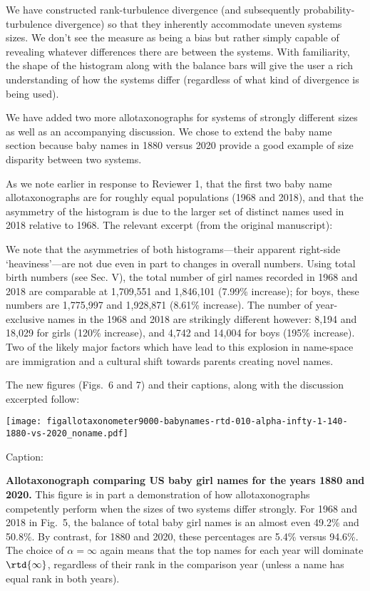 We have constructed rank-turbulence divergence
(and subsequently probability-turbulence divergence)
so that they inherently accommodate uneven systems sizes.
We don't see the measure as being a bias but rather
simply capable of revealing whatever differences there
are between the systems.
With familiarity, the shape of the histogram along with the balance bars
will give the user a rich understanding of how the systems differ
(regardless of what kind of divergence is being used).

We have added two more allotaxonographs for systems of strongly different sizes
as well as an accompanying discussion.
We chose to extend the baby name section because baby names in 1880 versus 2020
provide a good example of size disparity between two systems.

As we note earlier in response to Reviewer 1,
that the first two baby name allotaxonographs are for roughly
equal populations (1968 and 2018), and that the asymmetry of the
histogram is due to the larger set of distinct names used in 2018 relative to 1968.
The relevant excerpt (from the original manuscript):

\begin{excerpt}
  We note that the asymmetries of both histograms---their apparent
  right-side `heaviness'---are not due even in part
  to changes in overall numbers.
  Using total birth numbers (see Sec. V),
  the total number of girl names recorded in 1968 and 2018
  are comparable at 1,709,551 and 1,846,101 (7.99\% increase);
  for boys, these numbers are 1,775,997 and 1,928,871 (8.61\% increase).
  The number of year-exclusive names in the 1968 and 2018
  are strikingly different however:
  8,194 and 18,029 for girls (120\% increase),
  and 4,742 and 14,004 for boys (195\% increase).
  Two of the likely major factors which have lead to this explosion in name-space
  are immigration and a cultural shift towards parents creating novel names.
\end{excerpt}

The new figures (Figs.~6 and 7) and their captions, along with the discussion excerpted follow:

\texttt{[image: figallotaxonometer9000-babynames-rtd-010-alpha-infty-1-140-1880-vs-2020\_noname.pdf]}

Caption:

\begin{excerpt}
  \textbf{Allotaxonograph comparing US baby girl names for the years 1880 and 2020.}
  This figure is in part
  a demonstration of how allotaxonographs
  competently perform when the sizes of two systems differ strongly.
  For 1968 and 2018 in Fig.~5,
  the balance of total baby girl names 
  is an almost even 49.2\% and 50.8\%.
  By contrast, for 1880 and 2020, these percentages are 5.4\% versus 94.6\%.
  The choice of $\alpha=\infty$ again means that the top names for each year will
  dominate $\rtd{\infty}$, regardless of their rank in the comparison year
  (unless a name has equal rank in both years).
\end{excerpt}


